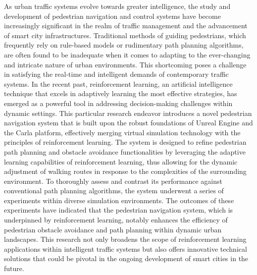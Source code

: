 \begin{abstracten}

As urban traffic systems evolve towards greater intelligence, the study and development of pedestrian navigation and control systems have become increasingly significant in the realm of traffic management and the advancement of smart city infrastructures. Traditional methods of guiding pedestrians, which frequently rely on rule-based models or rudimentary path planning algorithms, are often found to be inadequate when it comes to adapting to the ever-changing and intricate nature of urban environments. This shortcoming poses a challenge in satisfying the real-time and intelligent demands of contemporary traffic systems. In the recent past, reinforcement learning, an artificial intelligence technique that excels in adaptively learning the most effective strategies, has emerged as a powerful tool in addressing decision-making challenges within dynamic settings. This particular research endeavor introduces a novel pedestrian navigation system that is built upon the robust foundations of Unreal Engine and the Carla platform, effectively merging virtual simulation technology with the principles of reinforcement learning. The system is designed to refine pedestrian path planning and obstacle avoidance functionalities by leveraging the adaptive learning capabilities of reinforcement learning, thus allowing for the dynamic adjustment of walking routes in response to the complexities of the surrounding environment. To thoroughly assess and contrast its performance against conventional path planning algorithms, the system underwent a series of experiments within diverse simulation environments. The outcomes of these experiments have indicated that the pedestrian navigation system, which is underpinned by reinforcement learning, notably enhances the efficiency of pedestrian obstacle avoidance and path planning within dynamic urban landscapes. This research not only broadens the scope of reinforcement learning applications within intelligent traffic systems but also offers innovative technical solutions that could be pivotal in the ongoing development of smart cities in the future.

\end{abstracten}
